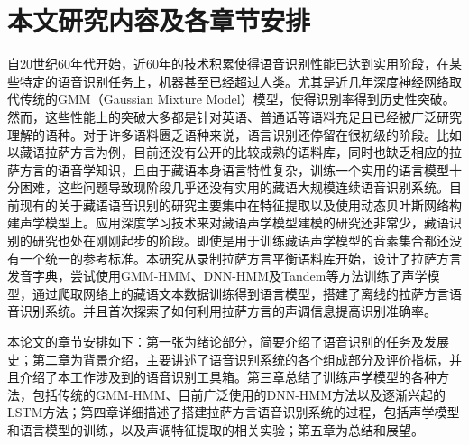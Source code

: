 \section{本文研究内容及各章节安排}
自20世纪60年代开始，近60年的技术积累使得语音识别性能已达到实用阶段，在某些特定的语音识别任务上，机器甚至已经超过人类。尤其是近几年深度神经网络取代传统的GMM（Gaussian Mixture Model）模型，使得识别率得到历史性突破。然而，这些性能上的突破大多都是针对英语、普通话等语料充足且已经被广泛研究理解的语种。对于许多语料匮乏语种来说，语言识别还停留在很初级的阶段。比如以藏语拉萨方言为例，目前还没有公开的比较成熟的语料库，同时也缺乏相应的拉萨方言的语音学知识，且由于藏语本身语言特性复杂，训练一个实用的语言模型十分困难，这些问题导致现阶段几乎还没有实用的藏语大规模连续语音识别系统。目前现有的关于藏语语音识别的研究主要集中在特征提取以及使用动态贝叶斯网络构建声学模型上。应用深度学习技术来对藏语声学模型建模的研究还非常少，藏语识别的研究也处在刚刚起步的阶段。即使是用于训练藏语声学模型的音素集合都还没有一个统一的参考标准。本研究从录制拉萨方言平衡语料库开始，设计了拉萨方言发音字典，尝试使用GMM-HMM、DNN-HMM及Tandem等方法训练了声学模型，通过爬取网络上的藏语文本数据训练得到语言模型，搭建了离线的拉萨方言语音识别系统。并且首次探索了如何利用拉萨方言的声调信息提高识别准确率。

本论文的章节安排如下：第一张为绪论部分，简要介绍了语音识别的任务及发展史；第二章为背景介绍，主要讲述了语音识别系统的各个组成部分及评价指标，并且介绍了本工作涉及到的语音识别工具箱。第三章总结了训练声学模型的各种方法，包括传统的GMM-HMM、目前广泛使用的DNN-HMM方法以及逐渐兴起的LSTM方法；第四章详细描述了搭建拉萨方言语音识别系统的过程，包括声学模型和语言模型的训练，以及声调特征提取的相关实验；第五章为总结和展望。